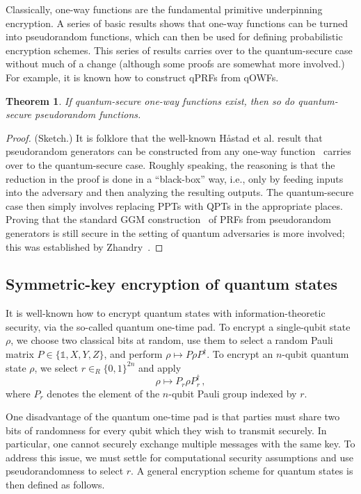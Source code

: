 \documentclass[11pt]{article}
\numberwithin{equation}{section}
\newtheorem{theorem}{Theorem}
\newcommand{\one}{\mathds 1}
\newcommand{\inrand}{\in_R}
\begin{document}
{Classically, one-way functions are the fundamental primitive underpinning encryption. A series of basic results shows that one-way functions can be turned into pseudorandom functions, which can then be used for defining probabilistic encryption schemes. This series of results carries over to the quantum-secure case without much of a change (although some proofs are somewhat more involved.) For example, it is known how to construct qPRFs from qOWFs.

\begin{theorem}\label{thm:qOWF-implies-qPRF}
If quantum-secure one-way functions exist, then so do quantum-secure pseudorandom functions.
\end{theorem}
\begin{proof} (Sketch.) It is folklore that the well-known H{\aa}stad et al. result that pseudorandom generators can be constructed from any one-way function~\cite{HILL99} carries over to the quantum-secure case. Roughly speaking, the reasoning is that the reduction in the proof is done in a ``black-box'' way, i.e., only by feeding inputs into the adversary and then analyzing the resulting outputs. The quantum-secure case then simply involves replacing PPTs with QPTs in the appropriate places. Proving that the standard GGM construction~\cite{GGM86} of PRFs from pseudorandom generators is still secure in the setting of quantum adversaries is more involved; this was established by Zhandry~\cite{Zhandry2012}.
\end{proof}

\subsection{Symmetric-key encryption of quantum states}\label{sec:scheme}

It is well-known how to encrypt quantum states with information-theoretic security, via the so-called quantum one-time pad. To encrypt a single-qubit state $\rho$, we choose two classical bits at random, use them to select a random Pauli matrix $P \in \{\one, X, Y, Z\}$, and perform $\rho \mapsto P \rho P^\dagger$. To encrypt an $n$-qubit quantum state $\rho$, we select $r \inrand \{0,1\}^{2n}$ and apply
\begin{equation}\label{eq:quantum-one-time-pad}
\rho \longmapsto P_r \rho P_r^\dagger\,,
\end{equation}
where $P_r$ denotes the element of the $n$-qubit Pauli group indexed by $r$. 

One disadvantage of the quantum one-time pad is that parties must share two bits of randomness for every qubit which they wish to transmit securely. In particular, one cannot securely exchange multiple messages with the same key. To address this issue, we must settle for computational security assumptions and use pseudorandomness to select $r$. A general encryption scheme for quantum states is then defined as follows.

}
\end{document}
